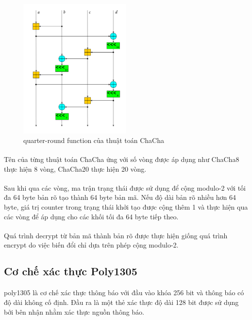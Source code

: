 \begin{figure}[h]
	\centering
	\includegraphics[width=0.5\textwidth]{images/ChaCha_Cipher_Quarter_Round_Function.png}
	\caption{\Gls{quarter}-\gls{round function} của thuật toán ChaCha}
\end{figure}

\paragraph{}
Tên của từng thuật toán ChaCha ứng với số vòng được áp dụng như ChaCha8 thực hiện 8 vòng, ChaCha20 thực hiện 20 vòng.

\paragraph{}
Sau khi qua các vòng, ma trận trạng thái được sử dụng để cộng modulo-2 với tối đa 64 byte bản rõ tạo thành 64 byte bản mã. Nếu độ dài bản rõ nhiều hơn 64 byte, giá trị counter trong trạng thái khởi tạo được cộng thêm 1 và thực hiện qua các vòng để áp dụng cho các khối tối đa 64 byte tiếp theo.

\paragraph{}
Quá trình \gls{decrypt} từ bản mã thành bản rõ được thực hiện giống quá trình \gls{encrypt} do việc biến đổi chỉ dựa trên phép cộng modulo-2.

\subsection{Cơ chế xác thực Poly1305}

\paragraph{}
\Gls{poly1305} là cơ chế xác thực thông báo với đầu vào khóa 256 bit và thông báo có độ dài không cố định. Đầu ra là một thẻ xác thực độ dài 128 bit được sử dụng bởi bên nhận nhằm xác thực nguồn thông báo.

